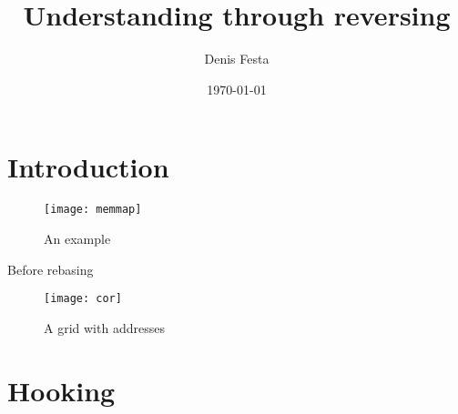 \documentclass[8pt, twoside, a4paper]{article}
\begin{document}
\title{Understanding through reversing}
\author{Denis Festa}
\date{\today}

\maketitle

\tableofcontents

\section{Introduction}
%
%
\begin{figure}[ht]
	\centering
	\texttt{[image: memmap]}
	\caption{An example}
	\label{fig:exmemmap}
\end{figure}

Before rebasing

\begin{figure}[ht]
	\centering
	\texttt{[image: cor]}
	\caption{A grid with addresses}
	\label{fig:cor}
\end{figure}



\section{Hooking}


\end{document}
